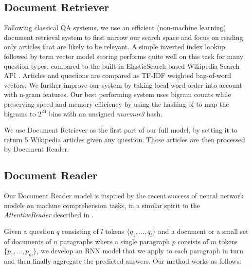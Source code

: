 \documentclass[11pt,a4paper]{article}
\newcommand\usr{Document Retriever\xspace}
\newcommand\usp{Document Reader\xspace}
\begin{document}
\subsection{\usr} \label{sec:irmodel}
Following classical QA systems, we use an efficient (non-machine learning) document retrieval system to first narrow our search space and focus on reading only articles that are likely to be relevant. A simple inverted index lookup followed by term vector model scoring performs quite well on this task for many question types, compared to the built-in ElasticSearch based Wikipedia Search API \cite{gormley2015elasticsearch}. Articles and questions are compared as TF-IDF weighted bag-of-word vectors.
%
%
We further improve our system by taking local word order into account with n-gram features. Our best performing system uses bigram counts while preserving speed and memory efficiency by using the hashing of \cite{weinberger2009feature} to map the bigrams to $2^{24}$ bins with an unsigned \emph{murmur3} hash.

We use \usr as the first part of our full model, by setting it to return 5 Wikipedia articles given any question. Those articles are then processed by \usp.


\subsection{Document Reader}
Our \usp model is inspired by the recent success of neural network models on machine comprehension tasks, in a similar spirit to the \emph{AttentiveReader} described in \cite{nips2015hermann,chen2016thorough}.


Given a question $q$ consisting of $l$ tokens $\{q_1, \ldots, q_l\}$ and a
document or a small set of documents of $n$ paragraphs where a single paragraph $p$ consists of $m$ tokens $\{p_1, \ldots, p_m\}$,  we develop an RNN model that we apply to each paragraph in turn and then finally aggregate the predicted answers. Our method works as follows:
\end{document}
